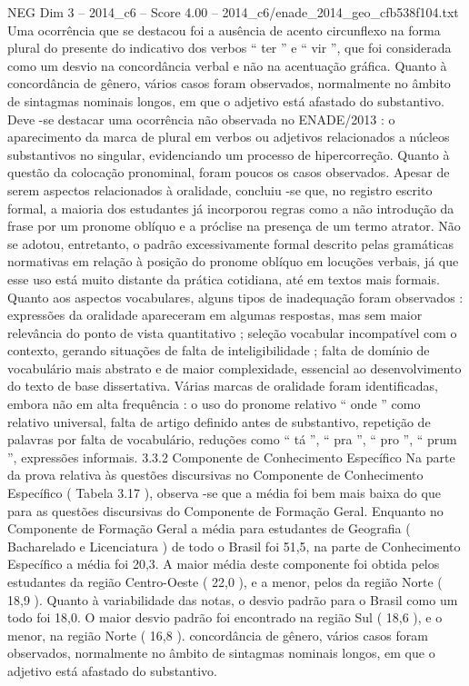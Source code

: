 \begin{textsample}{NEG Dim 3 – 2014\_c6 – Score 4.00 – 2014\_c6/enade\_2014\_geo\_cfb538f104.txt}
Uma ocorrência que se destacou foi a ausência de acento circunflexo na forma plural do presente do indicativo dos verbos “ ter ” e “ vir ”, que foi considerada como um desvio na concordância verbal e não na acentuação gráfica.
Quanto à concordância de gênero, vários casos foram observados, normalmente no âmbito de sintagmas nominais longos, em que o adjetivo está afastado do substantivo.
Deve -se destacar uma ocorrência não observada no ENADE/2013 : o aparecimento da marca de plural em verbos ou adjetivos relacionados a núcleos substantivos no singular, evidenciando um processo de hipercorreção.
Quanto à questão da colocação pronominal, foram poucos os casos observados.
Apesar de serem aspectos relacionados à oralidade, concluiu -se que, no registro escrito formal, a maioria dos estudantes já incorporou regras como a não introdução da frase por um pronome oblíquo e a próclise na presença de um termo atrator.
Não se adotou, entretanto, o padrão excessivamente formal descrito pelas gramáticas normativas em relação à posição do pronome oblíquo em locuções verbais, já que esse uso está muito distante da prática cotidiana, até em textos mais formais.
Quanto aos aspectos vocabulares, alguns tipos de inadequação foram observados : expressões da oralidade apareceram em algumas respostas, mas sem maior relevância do ponto de vista quantitativo ; seleção vocabular incompatível com o contexto, gerando situações de falta de inteligibilidade ; falta de domínio de vocabulário mais abstrato e de maior complexidade, essencial ao desenvolvimento do texto de base dissertativa.
Várias marcas de oralidade foram identificadas, embora não em alta frequência : o uso do pronome relativo “ onde ” como relativo universal, falta de artigo definido antes de substantivo, repetição de palavras por falta de vocabulário, reduções como “ tá ”, “ pra ”, “ pro ”, “ prum ”, expressões informais. 3.3.2 Componente de Conhecimento Específico Na parte da prova relativa às questões discursivas no Componente de Conhecimento Específico ( Tabela 3.17 ), observa -se que a média foi bem mais baixa do que para as questões discursivas do Componente de Formação Geral.
Enquanto no Componente de Formação Geral a média para estudantes de Geografia ( Bacharelado e Licenciatura ) de todo o Brasil foi 51,5, na parte de Conhecimento Específico a média foi 20,3.
A maior média deste componente foi obtida pelos estudantes da região Centro-Oeste ( 22,0 ), e a menor, pelos da região Norte ( 18,9 ).
Quanto à variabilidade das notas, o desvio padrão para o Brasil como um todo foi 18,0.
O maior desvio padrão foi encontrado na região Sul ( 18,6 ), e o menor, na região Norte ( 16,8 ). concordância de gênero, vários casos foram observados, normalmente no âmbito de sintagmas nominais longos, em que o adjetivo está afastado do substantivo.

\end{textsample}
